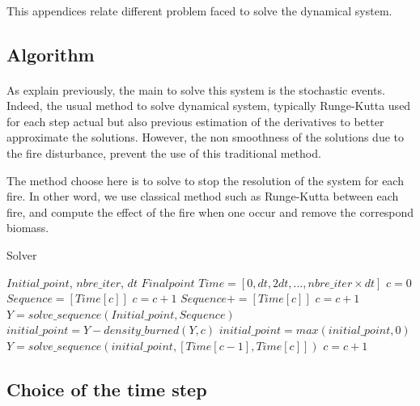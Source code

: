 \documentclass{article}
\begin{document}
\paragraph{}
This appendices relate different problem faced to solve the dynamical system.


\subsection{Algorithm}

\paragraph{}
As explain previously, the main to solve this system is the stochastic events. Indeed, the usual method to solve dynamical system, typically Runge-Kutta \citep{butcher1964implicit} used for each step actual but also previous estimation of the derivatives to better approximate the solutions. However, the non smoothness of the solutions due to the fire disturbance, prevent the use of this traditional method.

The method choose here is to solve to stop the resolution of the system for each fire. In other word, we use classical method such as Runge-Kutta between each fire, and compute the effect of the fire when one occur and remove the correspond biomass.



\begin{algorithm}
\caption{Solver}
\begin{algorithmic}
\REQUIRE $Initial\_point$, $nbre\_iter$, $dt$
\ENSURE $Final point$
\STATE $Time = [0, dt, 2dt, ..., nbre\_iter \times dt]$
\STATE $c=0$
        \STATE $Sequence = [Time[c]]$
        \STATE  $c = c + 1$
            \STATE $Sequence += [Time[c]]$
            \STATE $c = c + 1$
        \ENDWHILE
        \STATE $Y = solve\_sequence(Initial\_point, Sequence)$
    \ELSE
        \STATE $initial\_point = Y - density\_burned(Y, c)$
        \STATE $initial\_point = max(initial\_point, 0)$
        \STATE $Y = solve\_sequence(initial\_point, [Time[c-1], Time[c]])$
        \STATE $c = c + 1$
    \ENDIF
\ENDWHILE
\end{algorithmic}
\end{algorithm}

\newpage

\subsection{Choice of the time step}
\end{document}
